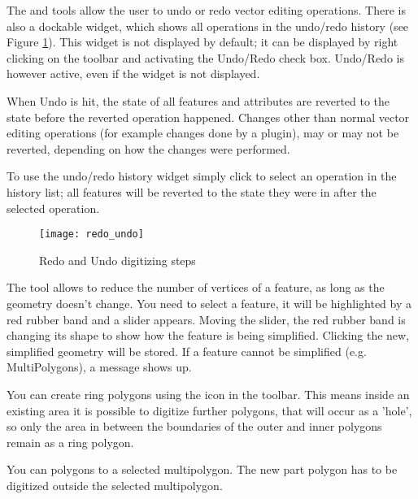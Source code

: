 The  and  tools
allow the user to undo or redo vector editing operations. There is also a dockable
widget, which shows all operations in the undo/redo history (see
Figure \ref{fig:vector_redoundo}). This widget is not displayed by
default; it can be displayed by right clicking on the toolbar and activating the
Undo/Redo check box. Undo/Redo is however active, even if the widget is not
displayed.

When Undo is hit, the state of all features and attributes are reverted to the
state before the reverted operation happened. Changes other than normal vector
editing operations (for example changes done by a plugin), may or may not be
reverted, depending on how the changes were performed.

To use the undo/redo history widget simply click to select an operation in the
history list; all features will be reverted to the state they were in after
the selected operation.

\begin{figure}[ht]
   \centering
   \texttt{[image: redo\_undo]}
   \caption{Redo and Undo digitizing steps \nixcaption}\label{fig:vector_redoundo}
\end{figure}


The  tool allows to reduce the
number of vertices of a feature, as long as the geometry doesn't change. You
need to select a feature, it will be highlighted by a red rubber band and a
slider appears. Moving the slider, the red rubber band is changing its shape
to show how the feature is being simplified. Clicking  the new,
simplified geometry will be stored. If a feature cannot be simplified (e.g.
MultiPolygons), a message shows up.


You can create ring polygons using the 
icon in the toolbar. This means inside an existing area it is
possible to digitize further polygons, that will occur as a 'hole', so only
the area in between the boundaries of the outer and inner polygons remain as
a ring polygon.


You can  polygons to a selected multipolygon.
The new part polygon has to be digitized outside the selected multipolygon.

